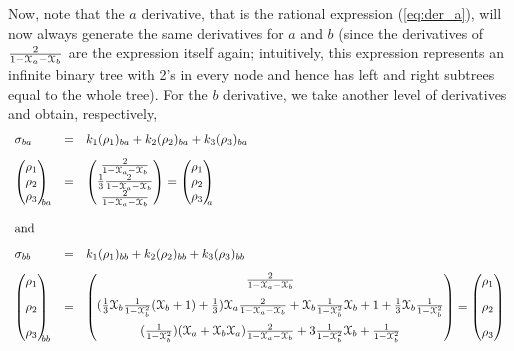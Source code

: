 \documentclass[3p]{elsarticle}
\begin{document}
Now, note that the $a$ derivative, that is the rational expression
(\ref{eq:der_a}), will now always generate the same
derivatives for $a$ and $b$ (since the derivatives of $\frac 2
{1-\mathcal{X}_a-\mathcal{X}_b}$ are the expression itself again; intuitively, this
expression represents an infinite binary
tree with 2's in every node and hence has left and right subtrees
equal to the whole tree).   For the $b$ derivative, we
take another level of derivatives and obtain, respectively,
$$
\begin{array}{lcl}
\sigma_{ba} &=& k_1(\rho_1)_{ba} + k_2(\rho_2)_{ba} + k_3(\rho_3)_{ba}\\[2ex]
 \begin{pmatrix} \rho_1 \\ \rho_2 \\ \rho_3
\end{pmatrix}_{\!\!\!\!ba}
&=& \begin{pmatrix}
\frac{2}{1-\Xa-\Xb} \\
\frac 1 3
\frac{2}{1-\Xa-\Xb} \\ \frac{2}{1-\Xa-\Xb}
\end{pmatrix} = \begin{pmatrix} \rho_1 \\ \rho_2 \\ \rho_3
\end{pmatrix}_{\!\!\!\!a}\\ [6ex]
\multicolumn{3}{l}{\text{and}}\\[2ex]
\sigma_{bb} &=& k_1(\rho_1)_{bb} + k_2(\rho_2)_{bb} + k_3(\rho_3)_{bb}\\[2ex]
 \begin{pmatrix} \rho_1 \\[2ex]
 \rho_2 \\[2ex]
 \rho_3
\end{pmatrix}_{\!\!\!\!bb}
&=& \begin{pmatrix}
\frac{2}{1-\Xa-\Xb} \\[2ex]
 (\frac{1}{3}\Xb\frac{1}{1-\Xb^2} (\Xb+1) +
\frac 1 3)
\Xa\frac{2}{1-\Xa-\Xb} + \Xb\frac{1}{1-\Xb^2}\Xb + 1 + \frac 1
3 \Xb \frac
{1} {1-\Xb^2} \\[2ex] (\frac{1}{1-\Xb^2}) (\Xa + \Xb
\Xa)
\frac{2}{1-\Xa-\Xb}   +  3
\frac{1}{1-\Xb^2} \Xb +
\frac{1}{1-\Xb^2}
\end{pmatrix} =  \begin{pmatrix} \rho_1 \\[2ex] \rho_2 \\[2ex] \rho_3 \end{pmatrix}
\end{array}
$$
\end{document}
